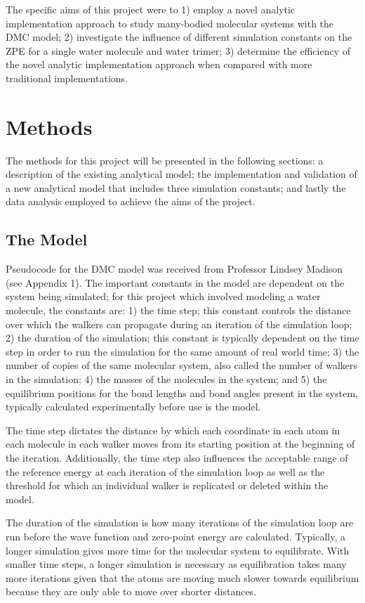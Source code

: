 \documentclass[journal=jacsat,manuscript=article]{achemso}
\begin{document}
The specific aims of this project were to 1) employ a novel analytic implementation approach to study many-bodied molecular systems with the DMC model; 2) investigate the influence of different simulation constants on the ZPE for a single water molecule and water trimer; 3) determine the efficiency of the novel analytic implementation approach when compared with more traditional implementations.

\section{Methods}
The methods for this project will be presented in the following sections: a description of the existing analytical model; the implementation and validation of a new analytical model that includes three simulation constants; and lastly the data analysis employed to achieve the aims of the project. 
\subsection{The Model}
Pseudocode for the DMC model was received from Professor Lindsey Madison (see Appendix 1). The important constants in the model are dependent on the system being simulated; for this project which involved modeling a water molecule, the constants are: 1) the time step; this constant controls the distance over which the walkers can propagate during an iteration of the simulation loop; 2) the duration of the simulation; this constant is typically dependent on the time step in order to run the simulation for the same amount of real world time; 3) the number of copies of the same molecular system, also called the number of walkers in the simulation; 4) the masses of the molecules in the system; and 5) the equilibrium positions for the bond lengths and bond angles present in the system, typically calculated experimentally before use is the model. 

The time step dictates the distance by which each coordinate in each atom in each molecule in each walker moves from its starting position at the beginning of the iteration. Additionally, the time step also influences the acceptable range of the reference energy at each iteration of the simulation loop as well as the threshold for which an individual walker is replicated or deleted within the model. 

The duration of the simulation is how many iterations of the simulation loop are run before the wave function and zero-point energy are calculated. Typically, a longer simulation gives more time for the molecular system to equilibrate. With smaller time steps, a longer simulation is necessary as equilibration takes many more iterations given that the atoms are moving much slower towards equilibrium because they are only able to move over shorter distances. 
\end{document}
